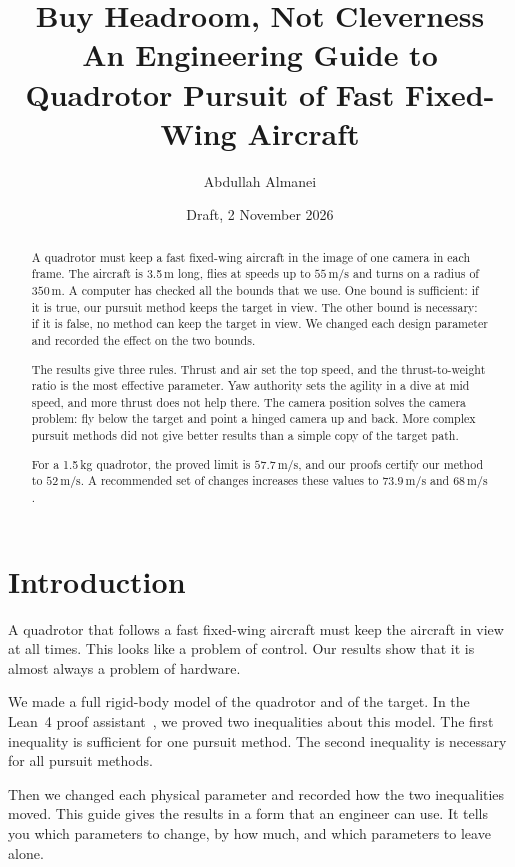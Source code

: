 \documentclass[11pt]{article}
\title{\textbf{Buy Headroom, Not Cleverness}\\[4pt]
\large An Engineering Guide to Quadrotor Pursuit of Fast Fixed-Wing Aircraft}
\author{Abdullah Almanei}
\date{Draft, 2 November 2026}
\newcommand{\ms}{\,\mathrm{m/s}}
\begin{document}
\maketitle

\begin{abstract}
A quadrotor must keep a fast fixed-wing aircraft in the image of one camera in each frame.
The aircraft is 3.5\,m long, flies at speeds up to $55\ms$ and turns on a radius of $350$\,m.
A computer has checked all the bounds that we use.
One bound is sufficient: if it is true, our pursuit method keeps the target in view.
The other bound is necessary: if it is false, no method can keep the target in view.
We changed each design parameter and recorded the effect on the two bounds.

The results give three rules.
Thrust and air set the top speed, and the thrust-to-weight ratio is the most effective parameter.
Yaw authority sets the agility in a dive at mid speed, and more thrust does not help there.
The camera position solves the camera problem: fly below the target and point a hinged camera up and back.
More complex pursuit methods did not give better results than a simple copy of the target path.

For a 1.5\,kg quadrotor, the proved limit is $57.7\ms$, and our proofs certify our method to $52\ms$.
A recommended set of changes increases these values to $73.9\ms$ and $68\ms$.
\end{abstract}

\section{Introduction}

A quadrotor that follows a fast fixed-wing aircraft must keep the aircraft in view at all times.
This looks like a problem of control.
Our results show that it is almost always a problem of hardware.

We made a full rigid-body model of the quadrotor and of the target.
In the Lean~4 proof assistant~\cite{lean4,mathlib}, we proved two inequalities about this model.
The first inequality is sufficient for one pursuit method.
The second inequality is necessary for all pursuit methods.

Then we changed each physical parameter and recorded how the two inequalities moved.
This guide gives the results in a form that an engineer can use.
It tells you which parameters to change, by how much, and which parameters to leave alone.
\end{document}
